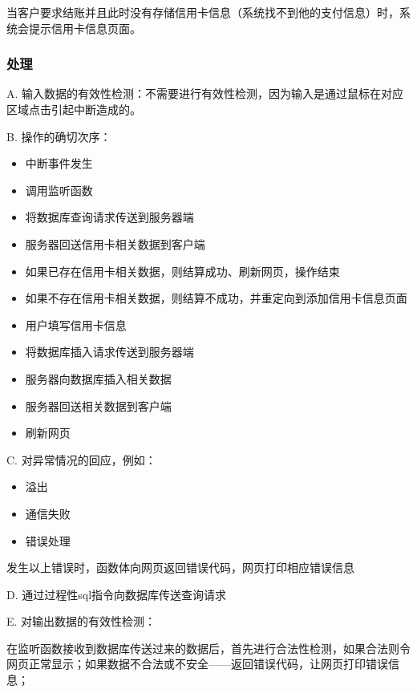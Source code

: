 		 当客户要求结账并且此时没有存储信用卡信息（系统找不到他的支付信息）时，系统会提示信用卡信息页面。
	  
	  
		 \subsubsection{处理}
		 
		 
		 
		 A. 输入数据的有效性检测：不需要进行有效性检测，因为输入是通过鼠标在对应区域点击引起中断造成的。
		 
		 B. 操作的确切次序：
		 \begin{adjustwidth}{2cm}{1cm}\qquad
			 \begin{itemize}
				 \item 中断事件发生
				 \item 调用监听函数
				 \item 将数据库查询请求传送到服务器端
				 \item 服务器回送信用卡相关数据到客户端
				 \item 如果已存在信用卡相关数据，则结算成功、刷新网页，操作结束
				 \item 如果不存在信用卡相关数据，则结算不成功，并重定向到添加信用卡信息页面
				 \item 用户填写信用卡信息
				 \item 将数据库插入请求传送到服务器端
				 \item 服务器向数据库插入相关数据
				 \item 服务器回送相关数据到客户端
				 \item 刷新网页
			 \end{itemize}		
		 \end{adjustwidth}
		  
		 
		 C. 对异常情况的回应，例如：
		 \begin{adjustwidth}{2cm}{1cm}\qquad
			 \begin{itemize}
				 \item 溢出
				 \item 通信失败
				 \item 错误处理
			 \end{itemize}		
		 \end{adjustwidth}
		 
			 发生以上错误时，函数体向网页返回错误代码，网页打印相应错误信息
		 
   D. 通过过程性sql指令向数据库传送查询请求
				 
		 E. 对输出数据的有效性检测：
		 
		 在监听函数接收到数据库传送过来的数据后，首先进行合法性检测，如果合法则令网页正常显示；如果数据不合法或不安全——返回错误代码，让网页打印错误信息；
		 
